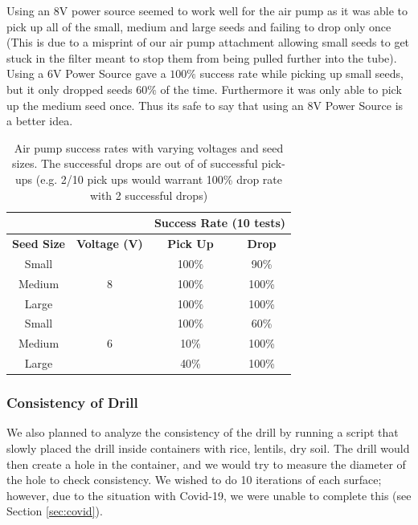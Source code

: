 \documentclass{article}
\begin{document}
Using an 8V power source seemed to work well for the air pump as it was able to pick up all of the small, medium and large seeds and failing to drop only once (This is due to a misprint of our air pump attachment allowing small seeds to get stuck in the filter meant to stop them from being pulled further into the tube). Using a 6V Power Source gave a $100\%$ success rate while picking up small seeds, but it only dropped seeds $60\%$ of the time. Furthermore it was only able to pick up the medium seed once. Thus its safe to say that using an 8V Power Source is a better idea. 

\begin{table}[h]
    \centering
    \begin{tabular}{|c|c|c|c|}
     \hline
    & & \multicolumn{2}{|c|}{\centering Success Rate (10 tests)} \\
    \hline
    \textbf{Seed Size} & \textbf{Voltage (V)} & \textbf{Pick Up} & \textbf{Drop} \\
    \hline
    Small & & 100\% & 90\% \\
    \cline{1-1}\cline{3-4}
    Medium & 8 & 100\% & 100\% \\
    \cline{1-1}\cline{3-4}
    Large & & 100\% & 100\% \\
    \hline
    Small & & 100\% & 60\% \\
    \cline{1-1}\cline{3-4}
    Medium & 6 & 10\% & 100\% \\
    \cline{1-1}\cline{3-4}
    Large & & 40\% & 100\% \\
    \hline
    
    \end{tabular}
    \caption{Air pump success rates with varying voltages and seed sizes. The successful drops are out of of successful pick-ups (e.g. 2/10 pick ups would warrant 100\% drop rate with 2 successful drops)}
    \label{tab:air-pump}
\end{table}

\vspace{-5mm}

\subsubsection{Consistency of Drill}
We also planned to analyze the consistency of the drill by running a script that slowly placed the drill inside containers with rice, lentils, dry soil. The drill would then create a hole in the container, and we would try to measure the diameter of the hole to check consistency. We wished to do 10 iterations of each surface; however, due to the situation with Covid-19, we were unable to complete this (see Section \ref{sec:covid}).
\end{document}
